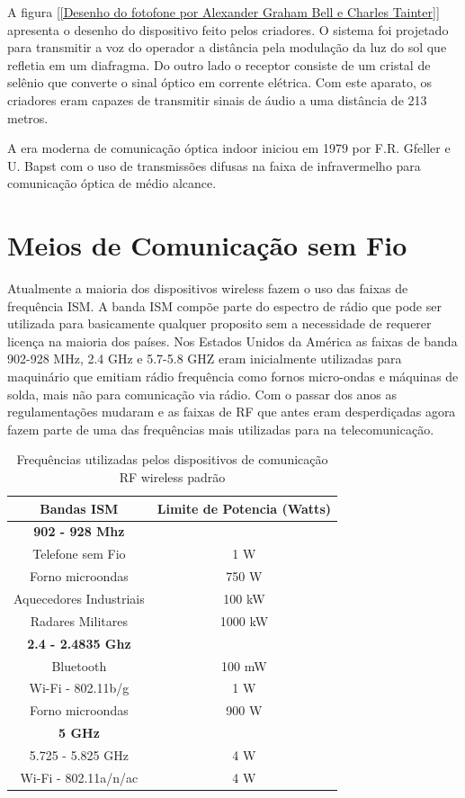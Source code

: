 A figura [\ref{Desenho do fotofone por Alexander Graham Bell e Charles Tainter}] apresenta o desenho do dispositivo feito pelos criadores. O sistema foi projetado para transmitir a voz do operador a distância pela modulação da luz do sol que refletia em um diafragma. Do outro lado o receptor consiste de um cristal de selênio que converte o sinal óptico em corrente elétrica. Com este aparato, os criadores eram capazes de transmitir sinais de áudio a uma distância de 213 metros. \cite{Fotofone}

A era moderna de comunicação óptica indoor iniciou em 1979 por F.R. Gfeller e U. Bapst com o uso de transmissões difusas na faixa de infravermelho para comunicação óptica de médio alcance.\cite{Gfeller}


\section{Meios de Comunicação sem Fio}

Atualmente a maioria dos dispositivos wireless fazem o uso das faixas de frequência ISM.
A banda ISM compõe parte do espectro de rádio que pode ser utilizada para basicamente qualquer proposito sem a necessidade de requerer licença na maioria dos países. Nos Estados Unidos da América as faixas de banda 902-928 MHz, 2.4 GHz e 5.7-5.8 GHZ eram inicialmente utilizadas para maquinário que emitiam rádio frequência como fornos micro-ondas e máquinas de solda, mais não para comunicação via rádio.
Com o passar dos anos as regulamentações mudaram e as faixas de RF que antes eram desperdiçadas agora fazem parte de uma das frequências mais utilizadas para na telecomunicação.

\begin{table}[h]
	\centering
	\begin{tabular}{cc}
		\toprule
		\textbf{Bandas ISM} & \textbf{Limite de Potencia (Watts)} \\
		\midrule
		\textbf{902 - 928 Mhz} &  \\ \hline
		Telefone sem Fio & 1 W\\
		Forno microondas & 750 W \\
		Aquecedores Industriais & 100 kW\\
		Radares Militares & 1000 kW\\ \hline
		\textbf{2.4 - 2.4835 Ghz}&  \\ \hline
		Bluetooth & 100 mW\\
		Wi-Fi - 802.11b/g & 1 W \\
		Forno microondas & 900 W\\ \hline
		\textbf{5 GHz} & \\ \hline
		5.725 - 5.825 GHz & 4 W\\
		Wi-Fi - 802.11a/n/ac & 4 W \\
		\bottomrule
	\end{tabular}
	\caption{Frequências utilizadas pelos dispositivos de comunicação RF wireless padrão \cite{ISM}}
	\label{Tab: frequencias RF}
\end{table}

